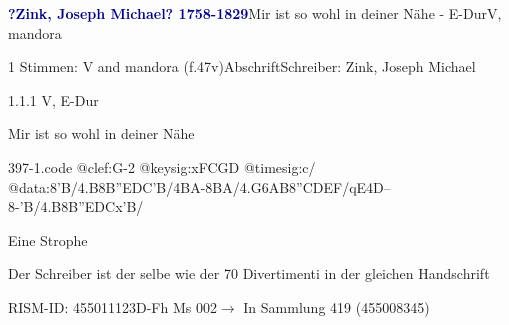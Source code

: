 \documentclass[twocolumn, 12pt]{book}
\begin{document}
\par \vspace{16pt} \textcolor{darkblue}{\textbf{?Zink, Joseph Michael?  1758-1829}}\hfillplus{\textbf{[397]}}\newline Mir ist so wohl in deiner Nähe - E-Dur\newline V, mandora
\par \begin{itshape}\end{itshape} 
\par \textcolor{darkblue}{}  1 Stimmen: V and mandora  (f.47v)\newline Abschrift\newline Schreiber: Zink, Joseph Michael
\par 1.1.1  V, E-Dur\newline \begin{footnotesize} Mir ist so wohl in deiner Nähe \end{footnotesize}  
\begin{filecontents*}{397-1.code}
@clef:G-2
@keysig:xFCGD
@timesig:c/
@data:8'B/4.B8B''EDC'B/4BA-{8BA}/4.G{6AB}8''CDEF/qE4D--8-'B/4.B8B''EDCx'B/
\end{filecontents*}
\newline %
\par Eine Strophe
\par Der Schreiber ist der selbe wie der 70 Divertimenti in der gleichen Handschrift
\par RISM-ID: 455011123\newline D-Fh  Ms 002\newline $\rightarrow$ In Sammlung 419 (455008345)
      
\end{document}
